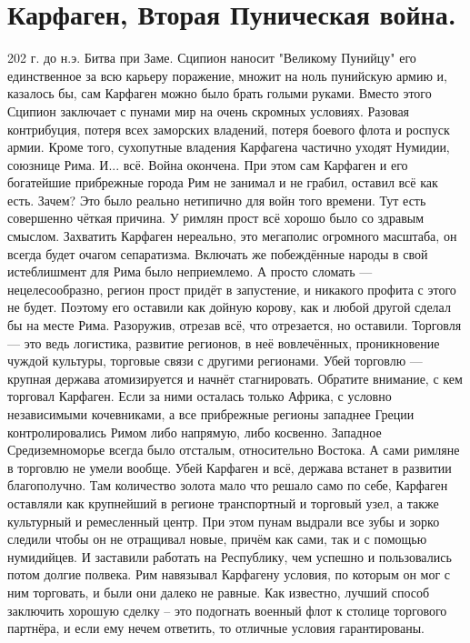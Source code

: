 \section{Карфаген, Вторая Пуническая война.}

202 г. до н.э. Битва при Заме. Сципион наносит "Великому Пунийцу" его единственное за всю карьеру поражение, множит на ноль пунийскую армию и, казалось бы, сам Карфаген можно было брать голыми руками. Вместо этого Сципион заключает с пунами мир на очень скромных условиях. Разовая контрибуция, потеря всех заморских владений, потеря боевого флота и роспуск армии. Кроме того, сухопутные владения Карфагена частично уходят Нумидии, союзнице Рима. И... всё. Война окончена. При этом сам Карфаген и его богатейшие прибрежные города Рим не занимал и не грабил, оставил всё как есть. Зачем? Это было реально нетипично для войн того времени. Тут есть совершенно чёткая причина. У римлян прост всё хорошо было со здравым смыслом. Захватить Карфаген нереально, это мегаполис огромного масштаба, он всегда будет очагом сепаратизма. Включать же побеждённые народы в свой истеблишмент для Рима было неприемлемо. А просто сломать — нецелесообразно, регион прост придёт в запустение, и никакого профита с этого не будет. Поэтому его оставили как дойную корову, как и любой другой сделал бы на месте Рима. Разоружив, отрезав всё, что отрезается, но оставили. Торговля — это ведь логистика, развитие регионов, в неё вовлечённых, проникновение чуждой культуры, торговые связи с другими регионами. Убей торговлю — крупная держава атомизируется и начнёт стагнировать. Обратите внимание, с кем торговал Карфаген. Если за ними осталась только Африка, с условно независимыми кочевниками, а все прибрежные регионы западнее Греции контролировались Римом либо напрямую, либо косвенно. Западное Средиземноморье всегда было отсталым, относительно Востока. А сами римляне в торговлю не умели вообще. Убей Карфаген и всё, держава встанет в развитии благополучно. Там количество золота мало что решало само по себе, Карфаген оставляли как крупнейший в регионе транспортный и торговый узел, а также культурный и ремесленный центр. При этом пунам выдрали все зубы и зорко следили чтобы он не отращивал новые, причём как сами, так и с помощью нумидийцев. И заставили работать на Республику, чем успешно и пользовались потом долгие полвека. Рим навязывал Карфагену условия, по которым он мог с ним торговать, и были они далеко не равные. Как известно, лучший способ заключить хорошую сделку – это подогнать военный флот к столице торгового партнёра, и если ему нечем ответить, то отличные условия гарантированы.
